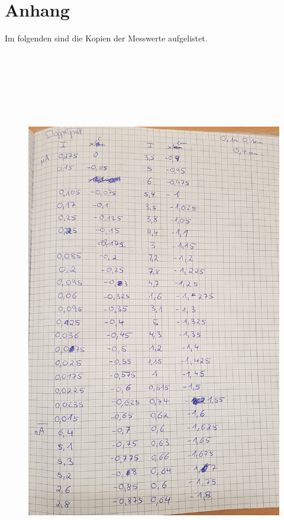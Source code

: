 \section{Anhang}
\label{sec:Anhang}
Im folgenden sind die Kopien der Messwerte aufgelistet.
\begin{figure}[H]
  \centering
  \includegraphics[height=24cm]{1 (5).jpg}
\end{figure}
